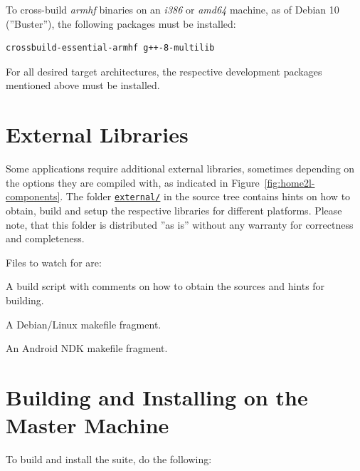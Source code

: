 \documentclass[12pt,english,parskip=half,headheight=19pt]{scrreprt}
\renewenvironment{description}[1][8ex]
  {\list{}{\labelwidth=5ex \leftmargin=#1 \let\makelabel\descriptionlabel}}
  {\endlist}
\newcommand{\lst}[1]{\colorbox{lstbackground}{\footnotesize\code{#1}}}
\newcommand{\refsrc}[1]{\href{#1}{\texttt{#1}}}     %
\begin{document}
To cross-build \textit{armhf} binaries on an \textit{i386} or \textit{amd64} machine, as of Debian 10 (''Buster''), the following packages must be installed:
\begin{lstlisting}
crossbuild-essential-armhf g++-8-multilib
\end{lstlisting}

For all desired target architectures, the respective development packages mentioned above must be installed.





\section{External Libraries}
\label{sec:installing-external}


Some applications require additional external libraries, sometimes depending on the options they are compiled with, as indicated in Figure~\ref{fig:home2l-components}. The folder \refsrc{external/} in the source tree contains hints on how to obtain, build and setup the respective libraries for different platforms. Please note, that this folder is distributed ''as is'' without any warranty for correctness and completeness.

Files to watch for are:

\begin{description}
\item[\lst{prebuild.sh}:]
  A build script with comments on how to obtain the sources and hints for building.
\item[\lst{Debian.mk}:]
  A Debian/Linux makefile fragment.
\item[\lst{Android.mk}:]
  An Android NDK makefile fragment.
\end{description}





\section{Building and Installing on the Master Machine}
\label{sec:installing-compiling}


To build and install the suite, do the following:
\end{document}
